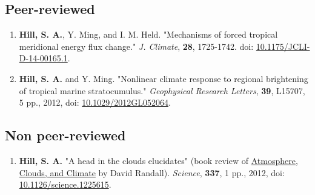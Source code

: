 \documentclass{article}
\begin{document}
\subsection*{Peer-reviewed}
\label{sec:orgheadline6}
\begin{enumerate}
\item \textbf{Hill, S. A.}, Y. Ming, and I. M. Held. "Mechanisms of forced tropical
meridional energy flux change."  \emph{J. Climate}, \textbf{28}, 1725-1742.  doi:
\href{http://dx.doi.org/10.1175/JCLI-D-14-00165.1}{10.1175/JCLI-D-14-00165.1}.
\item \textbf{Hill, S. A.} and Y. Ming. "Nonlinear climate response to regional
brightening of tropical marine stratocumulus."  \emph{Geophysical Research Letters},
\textbf{39}, L15707, 5 pp., 2012, doi: \href{http://dx.doi.org/10.1029/2012GL052064}{10.1029/2012GL052064}.
\end{enumerate}
\subsection*{Non peer-reviewed}
\label{sec:orgheadline7}
\begin{enumerate}
\item \textbf{Hill, S. A.} "A head in the clouds elucidates" (book review of
\href{http://press.princeton.edu/titles/9773.html}{Atmosphere, Clouds, and Climate} by David Randall). \emph{Science},
\textbf{337}, 1 pp., 2012, doi: \href{http://dx.doi.org/10.1126/science.1225615}{10.1126/science.1225615}.
\end{enumerate}
\end{document}
